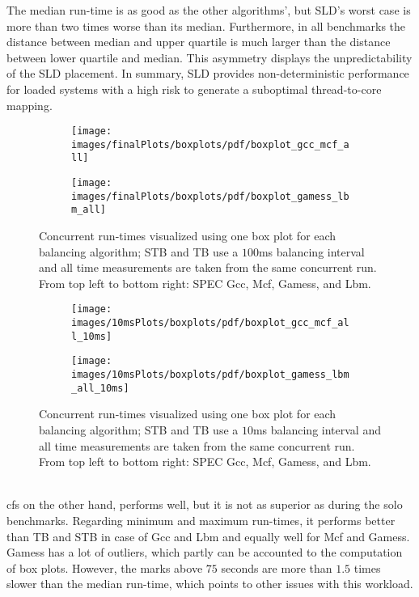 The median run-time is as good as the other algorithms', but SLD's worst case
is more than two times worse than its median.
Furthermore, in all benchmarks the distance between median and upper quartile
is much larger than the distance between lower quartile and median.
This asymmetry displays the unpredictability of the SLD placement.
In summary, SLD provides non-deterministic performance for loaded systems with a
high risk to generate a suboptimal thread-to-core mapping.
%
\begin{figure}[h!]
  \begin{subfigure}{\textwidth}
  \texttt{[image: images/finalPlots/boxplots/pdf/boxplot\_gcc\_mcf\_all]}
  \end{subfigure}
  \begin{subfigure}{\textwidth}
  \texttt{[image: images/finalPlots/boxplots/pdf/boxplot\_gamess\_lbm\_all]}
  \end{subfigure}
  \caption{Concurrent run-times visualized using one box plot for each balancing
    algorithm; STB and TB use a $100$ms balancing interval and all time
    measurements are taken from the same concurrent run.
    From top left to bottom right: SPEC Gcc, Mcf, Gamess, and Lbm.
    }
    \label{eval:fig:box_all}
\end{figure}
%
\begin{figure}[!ht]
  \begin{subfigure}{\textwidth}
  \texttt{[image: images/10msPlots/boxplots/pdf/boxplot\_gcc\_mcf\_all\_10ms]}
  \end{subfigure}
  \begin{subfigure}{\textwidth}
  \texttt{[image: images/10msPlots/boxplots/pdf/boxplot\_gamess\_lbm\_all\_10ms]}
  \end{subfigure}
  \caption{Concurrent run-times visualized using one box plot for each balancing
    algorithm; STB and TB use a $10$ms balancing interval and all time
    measurements are taken from the same concurrent run.
    From top left to bottom right: SPEC Gcc, Mcf, Gamess, and Lbm.
    }
  \label{eval:fig:box_all_10ms}
\end{figure}
\\


\Gls{cfs} on the other hand, performs well, but it is not as superior as during
the solo benchmarks.
Regarding minimum and maximum run-times, it performs better than TB and STB in
case of Gcc and Lbm and equally well for Mcf and Gamess.
Gamess has a lot of outliers, which partly can be accounted to the computation
of box plots.
However, the marks above $75$ seconds are more than $1.5$ times slower than the
median run-time, which points to other issues with this workload.


